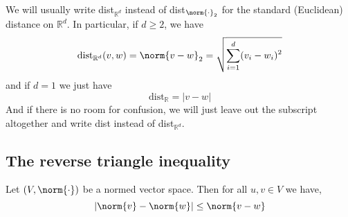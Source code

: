 \begin{remark}
    We will usually write dist$_{\mathbb{R}^d}$ instead of dist$_{\norm{\cdot}_2}$ for the standard (Euclidean) distance on $\mathbb{R}^d$.
    In particular, if $d \ge 2$, we have
    $$\text{dist}_{\mathbb{R}^d}(v,w) = \norm{v-w}_2 = \sqrt{\displaystyle\sum_{i=1}^d(v_i-w_i)^2} $$
    and if $d = 1$ we just have
    $$\text{dist}_\mathbb{R} = |v - w|$$
    And if there is no room for confusion, we will just leave out the subscript altogether and write dist instead of dist$_{\mathbb{R}^d}$.
\end{remark}

\subsection{The reverse triangle inequality}
\begin{lemma}
    Let $(V, \norm{\cdot})$ be a normed vector space. 
    Then for all $u,v \in V$ we have,
    $$|\norm{v} - \norm{w}| \le \norm{v - w}$$
\end{lemma}
